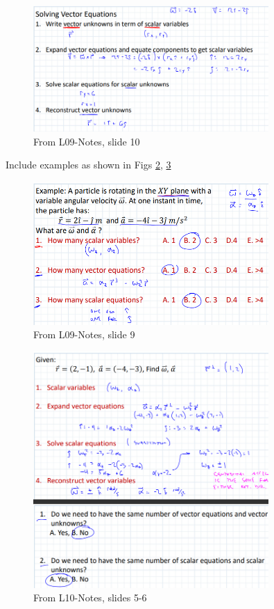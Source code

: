 \subsection{}

\begin{figure}[h!]
    \centering \includegraphics[width=0.8\textwidth]{VectorCalculusFigures/SolvingEqnsSteps.png}
    \caption{From L09-Notes, slide 10}
    \label{fig:SolvingEqnsSteps}
\end{figure}


Include examples as shown in Figs \ref{fig:SolvingEqns}, \ref{fig:SolvingEqns2} 

\begin{figure}[h!]
    \centering \includegraphics[width=0.8\textwidth]{VectorCalculusFigures/SolvingEqns.png}
    \caption{From L09-Notes, slide 9}
    \label{fig:SolvingEqns}
\end{figure}

\begin{figure}
    \centering \includegraphics[width=0.8\textwidth]{VectorCalculusFigures/SolvingEqns2.png}
    \caption{From L10-Notes, slides 5-6}
    \label{fig:SolvingEqns2}
\end{figure}